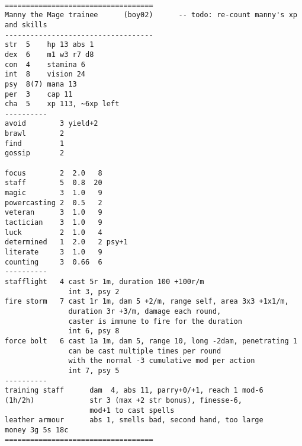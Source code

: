 \

\goodbreak
\tiny \begin{samepage} \begin{verbatim}
===================================
Manny the Mage trainee      (boy02)      -- todo: re-count manny's xp and skills
-----------------------------------
str  5    hp 13 abs 1
dex  6    m1 w3 r7 d8
con  4    stamina 6
int  8    vision 24
psy  8(7) mana 13
per  3    cap 11
cha  5    xp 113, ~6xp left
----------
avoid        3 yield+2
brawl        2
find         1
gossip       2

focus        2  2.0   8
staff        5  0.8  20
magic        3  1.0   9
powercasting 2  0.5   2
veteran      3  1.0   9
tactician    3  1.0   9
luck         2  1.0   4
determined   1  2.0   2 psy+1
literate     3  1.0   9
counting     3  0.66  6
----------
stafflight   4 cast 5r 1m, duration 100 +100r/m
               int 3, psy 2
fire storm   7 cast 1r 1m, dam 5 +2/m, range self, area 3x3 +1x1/m,
               duration 3r +3/m, damage each round,
               caster is immune to fire for the duration
               int 6, psy 8
force bolt   6 cast 1a 1m, dam 5, range 10, long -2dam, penetrating 1
               can be cast multiple times per round
               with the normal -3 cumulative mod per action
               int 7, psy 5
----------
training staff      dam  4, abs 11, parry+0/+1, reach 1 mod-6
(1h/2h)             str 3 (max +2 str bonus), finesse-6,
                    mod+1 to cast spells
leather armour      abs 1, smells bad, second hand, too large
money 3g 5s 18c
===================================
\end{verbatim} \end{samepage} \normalsize


\

